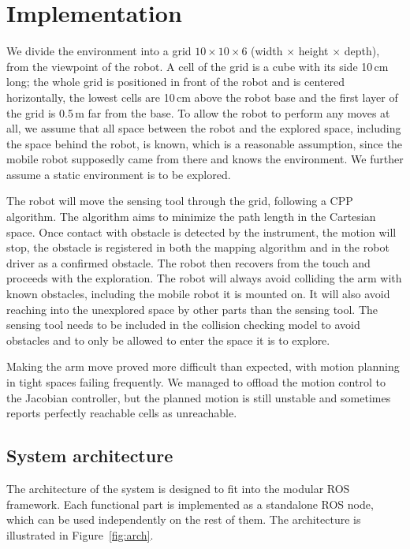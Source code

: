 \documentclass[buriama8_dp.tex]{subfiles}
\begin{document}
\chapter{Implementation}

We divide the environment into a grid \(10 \times 10 \times 6\) (width \(\times\) height \(\times\) depth), from the viewpoint of the robot. A cell of the grid is a cube with its side 10\,cm long; the whole grid is positioned in front of the robot and is centered horizontally, the lowest cells are 10\,cm above the robot base and the first layer of the grid is 0.5\,m far from the base. To allow the robot to perform any moves at all, we assume that all space between the robot and the explored space, including the space behind the robot, is known, which is a reasonable assumption, since the mobile robot supposedly came from there and knows the environment. We further assume a static environment is to be explored.

The robot will move the sensing tool through the grid, following a CPP algorithm. The algorithm aims to minimize the path length in the Cartesian space. Once contact with obstacle is detected by the instrument, the motion will stop, the obstacle is registered in both the mapping algorithm and in the robot driver as a confirmed obstacle. The robot then recovers from the touch and proceeds with the exploration. The robot will always avoid colliding the arm with known obstacles, including the mobile robot it is mounted on. It will also avoid reaching into the unexplored space by other parts than the sensing tool. The sensing tool needs to be included in the collision checking model to avoid obstacles and to only be allowed to enter the space it is to explore.

Making the arm move proved more difficult than expected, with motion planning in tight spaces failing frequently. We managed to offload the motion control to the Jacobian controller, but the planned motion is still unstable and sometimes reports perfectly reachable cells as unreachable.

\section{System architecture}
\label{sec:impl_arch}

The architecture of the system is designed to fit into the modular ROS framework. Each functional part is implemented as a standalone ROS node, which can be used independently on the rest of them. The architecture is illustrated in Figure~\ref{fig:arch}.
\end{document}
